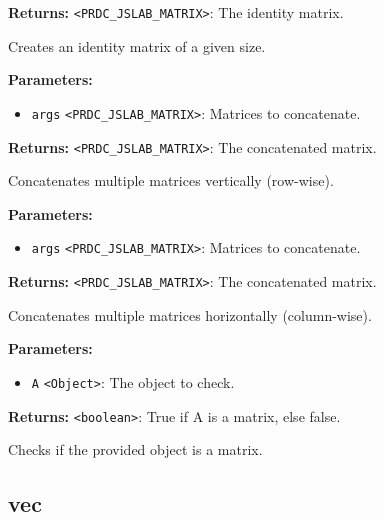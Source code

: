\documentclass[12pt,a4paper]{article}
\begin{document}
\noindent \textbf{Returns:} \texttt{<PRDC\_JSLAB\_MATRIX>}: The identity matrix.

\noindent Creates an identity matrix of a given size.

\vspace{5mm}
\noindent {}


\noindent \textbf{Parameters:}
\begin{itemize}
  \item \texttt{args} \texttt{<PRDC\_JSLAB\_MATRIX>}: Matrices to concatenate.
\end{itemize}

\noindent \textbf{Returns:} \texttt{<PRDC\_JSLAB\_MATRIX>}: The concatenated matrix.

\noindent Concatenates multiple matrices vertically (row-wise).

\vspace{5mm}
\noindent {}


\noindent \textbf{Parameters:}
\begin{itemize}
  \item \texttt{args} \texttt{<PRDC\_JSLAB\_MATRIX>}: Matrices to concatenate.
\end{itemize}

\noindent \textbf{Returns:} \texttt{<PRDC\_JSLAB\_MATRIX>}: The concatenated matrix.

\noindent Concatenates multiple matrices horizontally (column-wise).

\vspace{5mm}
\noindent {}


\noindent \textbf{Parameters:}
\begin{itemize}
  \item \texttt{A} \texttt{<Object>}: The object to check.
\end{itemize}

\noindent \textbf{Returns:} \texttt{<boolean>}: True if A is a matrix, else false.

\noindent Checks if the provided object is a matrix.


\subsection{vec}
\vspace{5mm}
\noindent {}
\end{document}

